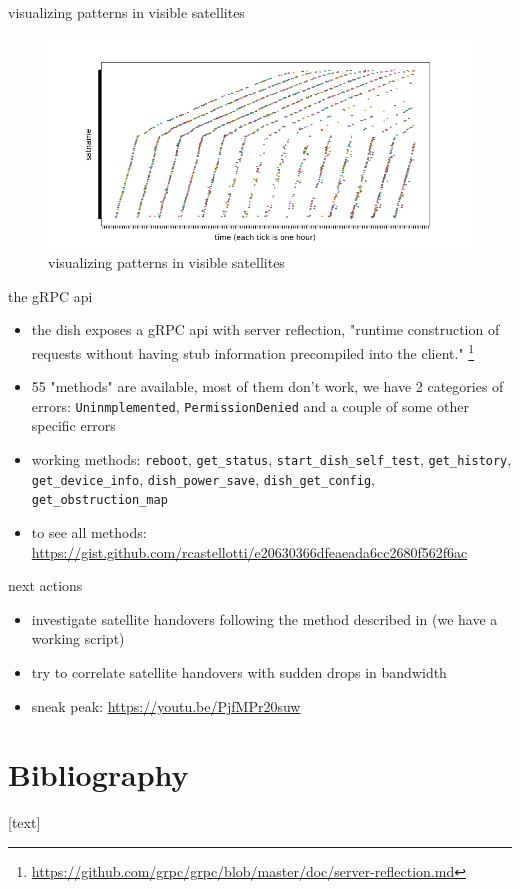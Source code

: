 \documentclass[NET,english,beameralt]{tumbeamer}
\begin{document}
\begin{frame}{visualizing patterns in visible satellites}
\begin{figure}
    \includegraphics[width=1\textwidth]{pics/visualizing-how-long-satellites-are-visible-for.png}
    \caption[short]{visualizing patterns in visible satellites}
\end{figure}
\end{frame}

\begin{frame}{the gRPC api}
\begin{itemize}
    \item the dish exposes a gRPC api with server reflection, "runtime construction of requests without having stub information precompiled into the client." \footnote{\href{https://github.com/grpc/grpc/blob/master/doc/server-reflection.md}{https://github.com/grpc/grpc/blob/master/doc/server-reflection.md}}
    \item 55 "methods" are available, most of them don't work, we have 2 categories of errors: \texttt{Uninmplemented}, \texttt{PermissionDenied} and a couple of some other specific errors 
    \item working methods: \texttt{reboot}, \texttt{get\_status}, \texttt{start\_dish\_self\_test}, \texttt{get\_history}, \texttt{get\_device\_info}, \texttt{dish\_power\_save}, \texttt{dish\_get\_config}, \texttt{get\_obstruction\_map}
    \item to see all methods: \href{https://gist.github.com/rcastellotti/e20630366dfeaeada6cc2680f562f6ac}{https://gist.github.com/rcastellotti/e20630366dfeaeada6cc2680f562f6ac}
\end{itemize}
\end{frame}

\begin{frame}{next actions}
\begin{itemize}
    \item investigate satellite handovers following the method described in \cite{izhikevich2023democratizing} (we have a working script)
    \item try to correlate satellite handovers with sudden drops in bandwidth
    \item sneak peak: \href{https://youtu.be/PjfMPr20suw}{https://youtu.be/PjfMPr20suw}
\end{itemize}
\end{frame}

\section{Bibliography}
\begin{frame}[allowframebreaks]
    
    [text]
    \footnotesize
    
\end{frame}
\end{document}
